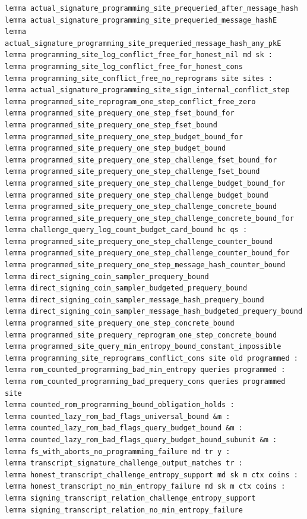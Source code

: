 \begin{lstlisting}[language=EasyCrypt,basicstyle=\ttfamily\tiny]
lemma actual_signature_programming_site_prequeried_after_message_hash
lemma actual_signature_programming_site_prequeried_message_hashE
lemma actual_signature_programming_site_prequeried_message_hash_any_pkE
lemma programming_site_log_conflict_free_for_honest_nil md sk :
lemma programming_site_log_conflict_free_for_honest_cons
lemma programming_site_conflict_free_no_reprograms site sites :
lemma actual_signature_programming_site_sign_internal_conflict_step
lemma programmed_site_reprogram_one_step_conflict_free_zero
lemma programmed_site_prequery_one_step_fset_bound_for
lemma programmed_site_prequery_one_step_fset_bound
lemma programmed_site_prequery_one_step_budget_bound_for
lemma programmed_site_prequery_one_step_budget_bound
lemma programmed_site_prequery_one_step_challenge_fset_bound_for
lemma programmed_site_prequery_one_step_challenge_fset_bound
lemma programmed_site_prequery_one_step_challenge_budget_bound_for
lemma programmed_site_prequery_one_step_challenge_budget_bound
lemma programmed_site_prequery_one_step_challenge_concrete_bound
lemma programmed_site_prequery_one_step_challenge_concrete_bound_for
lemma challenge_query_log_count_budget_card_bound hc qs :
lemma programmed_site_prequery_one_step_challenge_counter_bound
lemma programmed_site_prequery_one_step_challenge_counter_bound_for
lemma programmed_site_prequery_one_step_message_hash_counter_bound
lemma direct_signing_coin_sampler_prequery_bound
lemma direct_signing_coin_sampler_budgeted_prequery_bound
lemma direct_signing_coin_sampler_message_hash_prequery_bound
lemma direct_signing_coin_sampler_message_hash_budgeted_prequery_bound
lemma programmed_site_prequery_one_step_concrete_bound
lemma programmed_site_prequery_reprogram_one_step_concrete_bound
lemma programmed_site_query_min_entropy_bound_constant_impossible
lemma programming_site_reprograms_conflict_cons site old programmed :
lemma rom_counted_programming_bad_min_entropy queries programmed :
lemma rom_counted_programming_bad_prequery_cons queries programmed site
lemma counted_rom_programming_bound_obligation_holds :
lemma counted_lazy_rom_bad_flags_universal_bound &m :
lemma counted_lazy_rom_bad_flags_query_budget_bound &m :
lemma counted_lazy_rom_bad_flags_query_budget_bound_subunit &m :
lemma fs_with_aborts_no_programming_failure md tr y :
lemma transcript_signature_challenge_output_matches tr :
lemma honest_transcript_challenge_entropy_support md sk m ctx coins :
lemma honest_transcript_no_min_entropy_failure md sk m ctx coins :
lemma signing_transcript_relation_challenge_entropy_support
lemma signing_transcript_relation_no_min_entropy_failure

\end{lstlisting}
